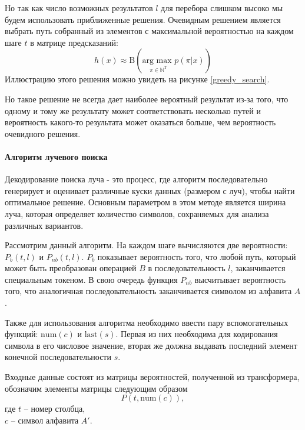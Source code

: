 Но так как число возможных результатов $l$ для перебора слишком высоко мы будем использовать приближенные решения. Очевидным решением является выбрать путь собранный из элементов с максимальной вероятностью на каждом шаге $t$ в матрице предсказаний:
\begin{equation}
    h(x) \approx \text{B}(\underset{\pi\in\mathbb{N}^T}{\text{arg max }}p(\pi|x))
\end{equation}
Иллюстрацию этого решения можно увидеть на рисунке \ref{greedy_search}.

\vspace{0.5em}

Но такое решение не всегда дает наиболее вероятный результат из-за того, что одному и тому же результату может соответствовать несколько путей и вероятность какого-то результата может оказаться больше, чем вероятность очевидного решения.

\paragraph{Алгоритм лучевого поиска}

Декодирование поиска луча - это процесс, где алгоритм последовательно генерирует и оценивает различные куски данных (размером с луч), чтобы найти оптимальное решение. Основным параметром в этом методе является ширина луча, которая определяет количество символов, сохраняемых для анализа различных вариантов.

Рассмотрим данный алгоритм. На каждом шаге вычисляются две вероятности: $P_b(t,l)$ и $P_{nb}(t,l)$. $P_b$  показывает вероятность того, что любой путь, который может быть преобразован операцией $B$ в последовательность $l$, заканчивается специальным токеном. В свою очередь функция $P_{nb}$  высчитывает вероятность того, что аналогичная последовательность заканчивается символом из алфавита $A$.

Также для использования алгоритма необходимо ввести пару вспомогательных функций: $\text{num}(c)$ и $\text{last}(s)$. Первая из них необходима для кодирования символа в его числовое значение, вторая же должна выдавать последний элемент конечной последовательности $s$.

Входные данные состоят из матрицы вероятностей, полученной из трансформера, обозначим элементы матрицы следующим образом
\begin{equation}
    P(t, \text{num}(c)),
\end{equation}
где $t$ -- номер столбца,\\ \phantom{где} $c$ -- символ алфавита $A'$.

